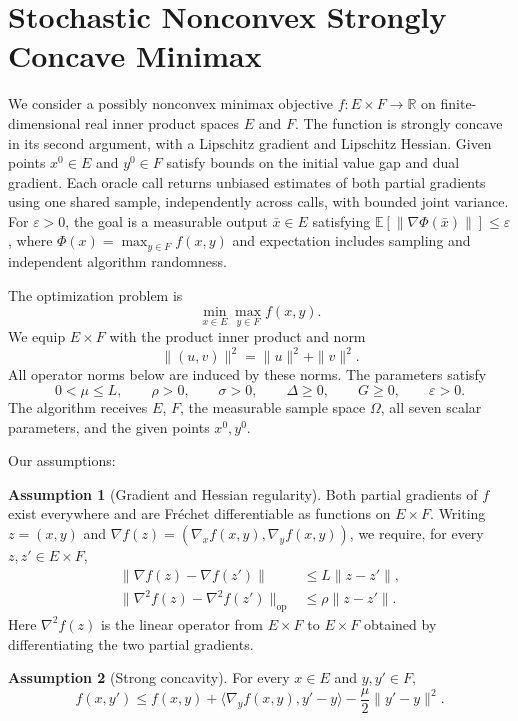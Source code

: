 \documentclass[10pt]{article}
\theoremstyle{definition}
\newtheorem{assumption}{Assumption}
\begin{document}
\section*{Stochastic Nonconvex Strongly Concave Minimax}
We consider a possibly nonconvex minimax objective $f:E\times F\to\mathbb{R}$ on finite-dimensional real inner product spaces $E$ and $F$. The function is strongly concave in its second argument, with a Lipschitz gradient and Lipschitz Hessian. Given points $x^0\in E$ and $y^0\in F$ satisfy bounds on the initial value gap and dual gradient. Each oracle call returns unbiased estimates of both partial gradients using one shared sample, independently across calls, with bounded joint variance. For $\varepsilon>0$, the goal is a measurable output $\bar{x}\in E$ satisfying $\mathbb{E}[\|\nabla\Phi(\bar{x})\|]\leq\varepsilon$, where $\Phi(x)=\max_{y\in F}f(x,y)$ and expectation includes sampling and independent algorithm randomness.

The optimization problem is
\[
\min_{x\in E}\max_{y\in F} f(x,y).
\]
We equip $E\times F$ with the product inner product and norm
\[
\|(u,v)\|^2=\|u\|^2+\|v\|^2.
\]
All operator norms below are induced by these norms. The parameters satisfy
\[
0<\mu\leq L,\qquad \rho>0,\qquad \sigma>0,\qquad
\Delta\geq0,\qquad G\geq0,\qquad \varepsilon>0.
\]
The algorithm receives $E$, $F$, the measurable sample space $\Omega$, all seven scalar parameters, and the given points $x^0,y^0$.

Our assumptions:
\begin{assumption}[Gradient and Hessian regularity]
Both partial gradients of $f$ exist everywhere and are Fr\'echet differentiable as functions on $E\times F$. Writing $z=(x,y)$ and $\nabla f(z)=(\nabla_x f(x,y),\nabla_y f(x,y))$, we require, for every $z,z'\in E\times F$,
\[
\begin{aligned}
\|\nabla f(z)-\nabla f(z')\|&\leq L\|z-z'\|,\\
\|\nabla^2 f(z)-\nabla^2 f(z')\|_{\mathrm{op}}
&\leq \rho\|z-z'\|.
\end{aligned}
\]
Here $\nabla^2 f(z)$ is the linear operator from $E\times F$ to $E\times F$ obtained by differentiating the two partial gradients.
\end{assumption}

\begin{assumption}[Strong concavity]
For every $x\in E$ and $y,y'\in F$,
\[
f(x,y')\leq f(x,y)+\langle\nabla_y f(x,y),y'-y\rangle
-\frac{\mu}{2}\|y'-y\|^2.
\]
\end{assumption}
\end{document}
